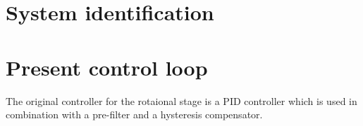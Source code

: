 \section{System identification}

\section{Present control loop}
The original controller for the rotaional stage is a PID controller which is used in combination with a pre-filter and a hysteresis compensator.
